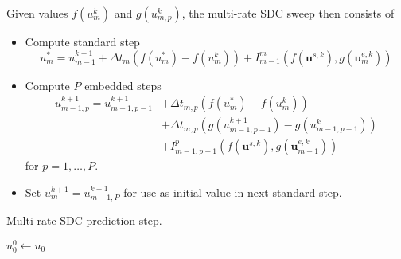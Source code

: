 \documentclass{article}
\newcommand{\ve}[1]{\mathbf{#1}}
\begin{document}
Given values $f(u^k_m)$ and $g(u^k_{m,p})$, the multi-rate SDC sweep then consists of
\begin{itemize}
\item Compute standard step
	\begin{equation}
		u^{*}_{m} = u^{k+1}_{m-1} + \Delta t_m \left( f(u^{*}_{m}) - f(u^k_{m}) \right) + I_{m-1}^{m} \left( f(\ve{u}^{s,k}) , g(\ve{u}^{e,k}_m) \right)
	\end{equation}
\item Compute $P$ embedded steps
	\begin{equation}
	\begin{aligned}
		u_{m-1,p}^{k+1} = u_{m-1,p-1}^{k+1} &+ \Delta t_{m,p} \left( f(u^{*}_{m}) - f(u^k_{m}) \right) \\
			& + \Delta t_{m,p} \left( g(u^{k+1}_{m-1,p-1}) - g(u^k_{m-1,p-1}) \right) \\
			& + I_{m-1,p-1}^{p}  \left( f(\ve{u}^{s,k}) , g(\ve{u}^{e,k}_{m-1}) \right) 
	\end{aligned}
	\end{equation}
	for $p=1, \ldots, P$.
\item Set $u_{m}^{k+1} = u_{m-1,P}^{k+1}$ for use as initial value in next standard step.
\end{itemize}
%
%
%
\begin{algorithm2e}
	\caption{Multi-rate SDC prediction step.}
         $u^0_0 \leftarrow u_0$\\
\end{algorithm2e}
%
%
%
\end{document}
